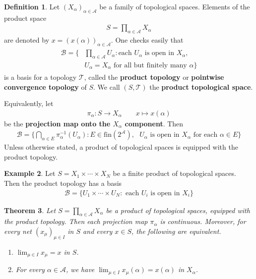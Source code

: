 \documentclass[12pt,b5paper,notitlepage]{article}
\theoremstyle{definition}
\newtheorem{df}{Definition}[section]
\newtheorem{eg}[df]{Example}
\theoremstyle{plain}
\newtheorem{thm}[df]{Theorem}
\newcommand{\mc}{\mathcal}
\newcommand{\scr}{\mathscr}
\newcommand{\fin}{\mathrm{fin}}
\newcommand{\dps}{\displaystyle}
\numberwithin{equation}{section}
\begin{document}
\begin{df}\label{lb454}
Let $(X_\alpha)_{\alpha\in\mc A}$ be a family of topological spaces. Elements of the product space
\begin{align*}
S=\prod_{\alpha\in\scr A}X_\alpha
\end{align*}
are denoted by $x=(x(\alpha))_{\alpha\in\scr A}$. One checks easily that
\begin{align}
\begin{aligned}
\mc B=\Big\{&\prod_{\alpha\in\scr A} U_\alpha: \text{each $U_\alpha$ is open in $X_\alpha$},\\
& \text{$U_\alpha=X_\alpha$ for all but finitely many $\alpha$}\Big\}
\end{aligned}
\end{align}
is a basis for a topology $\mc T$, called the \textbf{product topology}  or \textbf{pointwise convergence topology}  of $S$. We call $(S,\mc T)$ the \textbf{product topological space}.  

Equivalently, let
\begin{gather}
\pi_\alpha:S\rightarrow X_\alpha \qquad x\mapsto x(\alpha)
\end{gather}
be the \textbf{projection map onto the $X_\alpha$ component}. Then
\begin{align}
\mc B=\Big\{\bigcap_{\alpha\in E} \pi_\alpha^{-1}(U_\alpha):E\in\fin(2^{\scr A}), \text{ $U_\alpha$ is open in $X_\alpha$ for each $\alpha\in E$}    \Big\}
\end{align}
Unless otherwise stated, a product of topological spaces is equipped with the product topology.  \hfill\qedsymbol
\end{df}



\begin{eg}\label{lb226}
Let $S=X_1\times\cdots\times X_N$ be a finite product of topological spaces. Then the product topology has a basis
\begin{align}
\mc B=\{ U_1\times\cdots \times U_N:\text{ each $U_i$ is open in $X_i$}\}
\end{align}
\end{eg}


\begin{thm}\label{lb192}
Let $S=\prod_{\alpha\in\scr A}X_\alpha$ be a product of topological spaces, equipped with the product topology. Then each projection map $\pi_\alpha$ is continuous. Moreover, for every net $(x_\mu)_{\mu\in I}$ in $S$ and every $x\in S$, the following are equivalent.
\begin{enumerate}[label=(\arabic*)]
\item $\dps\lim_{\mu\in I}x_\mu=x$ in $S$.
\item For every $\alpha\in\scr A$, we have $\dps\lim_{\mu\in I}x_\mu(\alpha)=x(\alpha)$ in $X_\alpha$.
\end{enumerate}
\end{thm}
\end{document}
